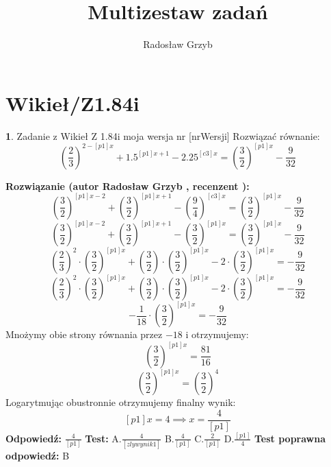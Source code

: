 \documentclass[12pt, a4paper]{article}
\title{Multizestaw zadań}
\author{Radosław Grzyb}
\date{}
\theoremstyle{definition} %
\newtheorem{zad}{}
\newcommand{\kategoria}[1]{\section{#1}} %
\newcommand{\zadStart}[1]{\begin{zad}#1\newline} %
\newcommand{\zadStop}{\end{zad}}   %
\newcommand{\rozwStart}[2]{\noindent \textbf{Rozwiązanie (autor #1 , recenzent #2): }\newline} %
\newcommand{\rozwStop}{\newline}                                            %
\newcommand{\odpStart}{\noindent \textbf{Odpowiedź:}\newline}    %
\newcommand{\odpStop}{\newline}                                             %
\newcommand{\testStart}{\noindent \textbf{Test:}\newline} %
\newcommand{\testStop}{\newline} %
\newcommand{\kluczStart}{\noindent \textbf{Test poprawna odpowiedź:}\newline} %
\newcommand{\kluczStop}{\newline} %
\begin{document}
\maketitle
\kategoria{Wikieł/Z1.84i}
\zadStart{Zadanie z Wikieł Z 1.84i moja wersja nr [nrWersji]}
Rozwiązać równanie:
$$\left(\frac{2}{3}\right)^{2-[p1]x}+1.5^{[p1]x+1}-2.25^{[c3]x}=\left(\frac{3}{2}\right)^{[p1]x}-\frac{9}{32}$$
\zadStop
\rozwStart{Radosław Grzyb}{}
$$\left(\frac{3}{2}\right)^{[p1]x-2}+\left(\frac{3}{2}\right)^{[p1]x+1}-\left(\frac{9}{4}\right)^{[c3]x}=\left(\frac{3}{2}\right)^{[p1]x}-\frac{9}{32}$$
$$\left(\frac{3}{2}\right)^{[p1]x-2}+\left(\frac{3}{2}\right)^{[p1]x+1}-\left(\frac{3}{2}\right)^{[p1]x}=\left(\frac{3}{2}\right)^{[p1]x}-\frac{9}{32}$$
$$\left(\frac{2}{3}\right)^{2}\cdot\left(\frac{3}{2}\right)^{[p1]x}+\left(\frac{3}{2}\right)\cdot\left(\frac{3}{2}\right)^{[p1]x}-2\cdot\left(\frac{3}{2}\right)^{[p1]x}=-\frac{9}{32}$$
$$\left(\frac{2}{3}\right)^{2}\cdot\left(\frac{3}{2}\right)^{[p1]x}+\left(\frac{3}{2}\right)\cdot\left(\frac{3}{2}\right)^{[p1]x}-2\cdot\left(\frac{3}{2}\right)^{[p1]x}=-\frac{9}{32}$$
$$-\frac{1}{18}\cdot\left(\frac{3}{2}\right)^{[p1]x}=-\frac{9}{32}$$
Mnożymy obie strony równania przez $-18$ i otrzymujemy:
$$\left(\frac{3}{2}\right)^{[p1]x}=\frac{81}{16}$$
$$\left(\frac{3}{2}\right)^{[p1]x}=\left(\frac{3}{2}\right)^{4}$$
Logarytmując obustronnie otrzymujemy finalny wynik:
$$[p1]x=4\implies x=\frac{4}{[p1]}$$
\rozwStop
\odpStart
$\frac{4}{[p1]}$
\odpStop
\testStart
A.$\frac{4}{[zlywynik1]}$
B.$\frac{4}{[p1]}$
C.$\frac{2}{[p1]}$
D.$\frac{[p1]}{4}$
\testStop
\kluczStart
B
\kluczStop
\end{document}
